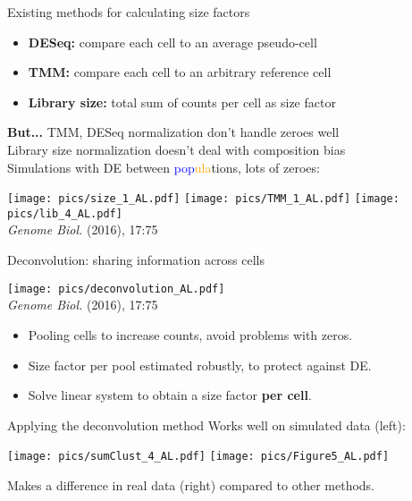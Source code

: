 \documentclass{beamer}
\begin{document}
\begin{frame}{Existing methods for calculating size factors}
\begin{itemize}
\item \textbf{DESeq:} compare each cell to an average pseudo-cell 
\item \textbf{TMM:} compare each cell to an arbitrary reference cell
\item \textbf{Library size:} total sum of counts per cell as size factor 
\end{itemize}

\vspace{0.05in}
\textbf{But...} TMM, DESeq normalization don't handle zeroes well \\
Library size normalization doesn't deal with composition bias \\[0.1in]

Simulations with DE between \textcolor{blue}{pop}\textcolor{orange}{ula}tions, lots of zeroes:
\begin{center}
    \texttt{[image: pics/size\_1\_AL.pdf]}
    \texttt{[image: pics/TMM\_1\_AL.pdf]}
    \texttt{[image: pics/lib\_4\_AL.pdf]} \\
    {\tiny \emph{Genome Biol.} (2016), 17:75}
\end{center}
\end{frame}

\begin{frame}{Deconvolution: sharing information across cells}
    \begin{center}
        \texttt{[image: pics/deconvolution\_AL.pdf]} \\
    {\tiny \emph{Genome Biol.} (2016), 17:75}
    \end{center}
    \vspace{-0.1in}
    \begin{itemize}
        \item Pooling cells to increase counts, avoid problems with zeros.
        \item Size factor per pool estimated robustly, to protect against DE.
        \item Solve linear system to obtain a size factor \textbf{per cell}.
    \end{itemize}
\end{frame}

\begin{frame}{Applying the deconvolution method}
    Works well on simulated data (left):
    \begin{center}    
    \texttt{[image: pics/sumClust\_4\_AL.pdf]} 
    \texttt{[image: pics/Figure5\_AL.pdf]}
    \end{center}
    Makes a difference in real data (right) compared to other methods. \\[0.1in]
\end{frame}
\end{document}
